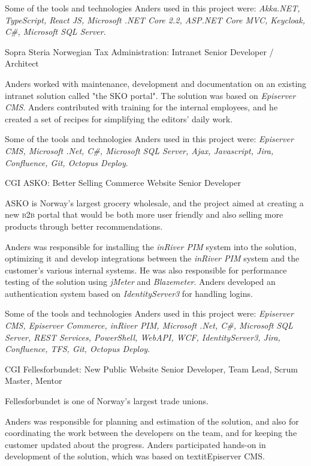 \documentclass[10pt]{article} %
\begin{document}
\begin{paracol}{2}
{\qquad Some of the tools and technologies Anders used in this project were: \textit{Akka.NET, TypeScript, React JS, Microsoft .NET Core 2.2, ASP.NET Core MVC, Keycloak, C\#, Microsoft SQL Server}.} 



{Sopra Steria} %
{Norwegian Tax Administration: Intranet} 
{Senior Developer / Architect} 
{Anders worked with maintenance, development and documentation on an existing intranet solution called "the SKO portal". The solution was based on \textit{Episerver CMS}. Anders contributed with training for the internal employees, and he created a set of recipes for simplifying the editors' daily work.

\qquad Some of the tools and technologies Anders used in this project were: \textit{Episerver CMS, Microsoft .Net, C\#, Microsoft SQL Server, Ajax, Javascript, Jira, Confluence, Git, Octopus Deploy}.} 

{CGI} %
{ASKO: Better Selling Commerce Website} 
{Senior Developer} 
{ASKO is Norway's largest grocery wholesale, and the project aimed at creating a new \textsc{b2b} portal that would be both more user friendly and also selling more products through better recommendations.

\qquad Anders was responsible for installing the \textit{inRiver PIM} system into the solution, optimizing it and develop integrations between the \textit{inRiver PIM} system and the customer's various internal systems. He was also responsible for performance testing of
the solution using \textit{jMeter} and \textit{Blazemeter}. Anders developed an authentication system based on \textit{IdentityServer3}
for handling logins.

\qquad Some of the tools and technologies Anders used in this project were: \textit{Episerver CMS, Episerver Commerce, inRiver PIM, Microsoft .Net, C\#, Microsoft SQL Server, REST Services, PowerShell, WebAPI, WCF, IdentityServer3, Jira, Confluence, TFS, Git, Octopus Deploy}.} 
\pagebreak


{CGI} 
{Fellesforbundet: New Public Website} 
{Senior Developer, Team Lead, Scrum Master, Mentor} 
{Fellesforbundet is one of Norway's largest trade unions.

\qquad Anders was responsible for planning and estimation of the solution, and also for coordinating the work between the developers on the team, and for keeping the customer updated about the progress. Anders participated hands-on in development of the solution, which was based on textit{Episerver CMS}.

}
\end{paracol}
\end{document}
